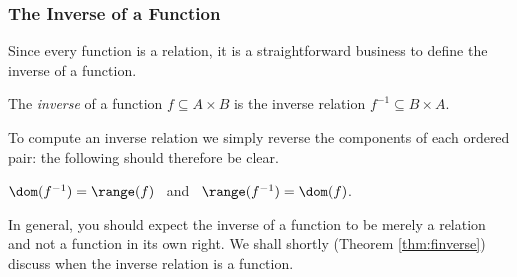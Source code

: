 \subsubsection*{The Inverse of a Function}

Since every function is a relation, it is a straightforward business to define the inverse of a function.

\begin{defn}
The \emph{inverse} of a function $f\subseteq A\times B$ is the inverse relation $f^{-1}\subseteq B\times A$.
\end{defn}

\noindent To compute an inverse relation we simply reverse the components of each ordered pair: the following should therefore be clear.

\begin{thm}\label{thm:inversedomrange}
$\dom(f^{-1})=\range(f)$ \ and \ $\range(f^{-1})=\dom(f)$.
\end{thm}

\noindent In general, you should expect the inverse of a function to be merely a relation and not a function in its own right. We shall shortly (Theorem \ref{thm:finverse}) discuss when the inverse relation is a function.


